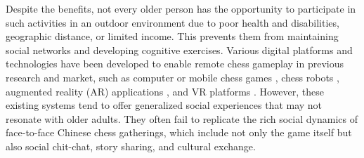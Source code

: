 Despite the benefits, not every older person has the opportunity to participate in such activities in an outdoor environment due to poor health and disabilities, geographic distance, or limited income. This prevents them from maintaining social networks and developing cognitive exercises. Various digital platforms and technologies have been developed to enable remote chess gameplay in previous research and market, such as computer or mobile chess games \cite{qqchess_webpage,bontchev2008mobile}, chess robots \cite{larregay2018design,kolosowski2020collaborative}, augmented reality (AR) applications \cite{chen2008remote,cerron2023multiplayer,yusof2019collaborative}, and VR platforms \cite{very_real_chess_steam,chess_vr_multiverse_journey_steam,vrchat_chess_world}. However, these existing systems tend to offer generalized social experiences that may not resonate with older adults. They often fail to replicate the rich social dynamics of face-to-face Chinese chess gatherings, which include not only the game itself but also social chit-chat, story sharing, and cultural exchange.